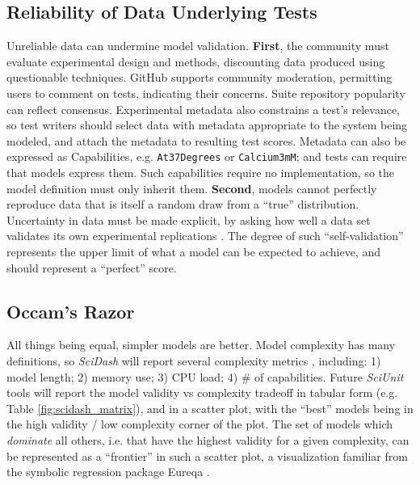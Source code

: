 \documentclass{frontiersSCNS}
\let\verbx\lstinline
\begin{document}
\subsection{Reliability of Data Underlying Tests}
Unreliable data can undermine model validation. 
\textbf{First}, the community must evaluate experimental design and methods, discounting data produced using questionable techniques. 
GitHub supports community moderation, permitting users to comment on tests, indicating their concerns. 
Suite repository popularity can reflect consensus. 
Experimental metadata also constrains a test's relevance, so test writers should select data with metadata appropriate to the system being modeled, and attach the metadata to resulting test scores. 
Metadata can also be expressed as Capabilities, e.g. \verbx{At37Degrees} or \verbx{Calcium3mM}; and tests can require that models express them. 
Such capabilities require no implementation, so the model definition must only inherit them. 
\textbf{Second}, models cannot perfectly reproduce data that is itself a random draw from a ``true'' distribution. 
Uncertainty in data must be made explicit, by asking how well a data set validates its own experimental replications \citep{kriegeskorte_representational_2008}. 
The degree of such ``self-validation'' represents the upper limit of what a model can be expected to achieve, and should represent a ``perfect'' score.  

\subsection{Occam's Razor}
All things being equal, simpler models are better. 
Model complexity has many definitions, so \textit{SciDash} will report several complexity metrics \citep{mccabe_complexity_1976}, including: 
1) model length; 2) memory use; 3) CPU load; 4) \# of capabilities. 
Future \textit{SciUnit} tools will report the model validity vs complexity tradeoff in tabular form (e.g. Table \ref{fig:scidash_matrix}), and in a scatter plot, with the ``best'' models being in the high validity / low complexity corner of the plot. 
The set of models which \textit{dominate} all others, i.e. that have the highest validity for a given complexity, can be represented as a ``frontier'' in such a scatter plot, a visualization familiar from the symbolic regression package Eureqa \citep{schmidt_distilling_2009}.  
\end{document}
